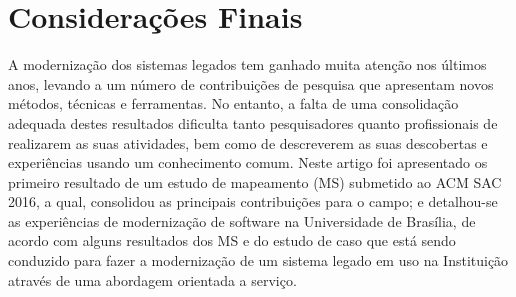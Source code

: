 \section{Considerações Finais}\label{sec:final-remarks}

A modernização dos sistemas legados tem ganhado muita atenção nos últimos anos, levando
a um número de contribuições de pesquisa que apresentam novos métodos, técnicas e ferramentas. No entanto, a falta de uma consolidação adequada destes resultados dificulta tanto pesquisadores quanto profissionais de realizarem as suas atividades, bem como de descreverem as suas descobertas e experiências usando um conhecimento comum. Neste artigo foi apresentado os primeiro resultado de um estudo de mapeamento (MS) submetido ao ACM SAC 2016, a qual, consolidou as principais contribuições para o campo; e detalhou-se as experiências de modernização de software na Universidade de Bras\'{i}lia, de acordo com alguns resultados dos MS e do estudo de caso que está sendo conduzido para fazer a modernização de um sistema legado em uso na Instituição através de uma abordagem orientada a serviço. 

